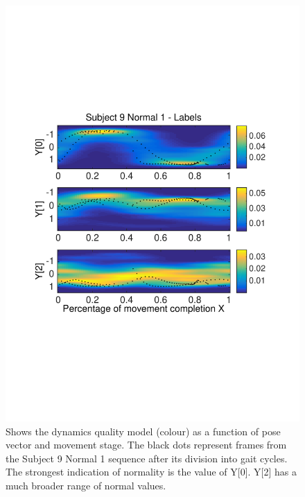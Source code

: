 \documentclass[11pt]{article} %
\begin{document}
\begin{figure}
\centering
\includegraphics*[width=0.73\linewidth,trim={0cm 7.5cm 0cm 6.7cm},clip]{quality_s9n1_FT_labels.pdf}
\caption{Shows the dynamics quality model (colour) as a function of pose vector and movement stage. The black dots represent frames from the Subject 9 Normal 1 sequence after its division into gait cycles. The strongest indication of normality is the value of Y[0]. Y[2] has a much broader range of normal values.}
\label{fig:qualityHeatMap}
\end{figure}
\end{document}
